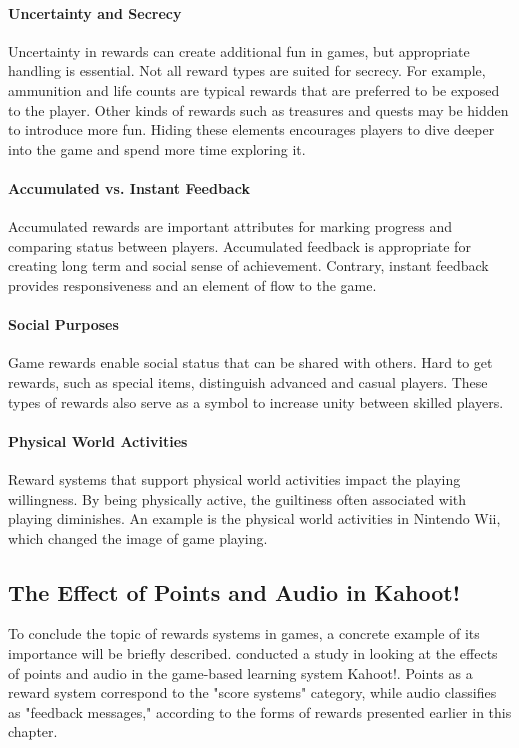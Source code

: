 \paragraph*{Uncertainty and Secrecy}
Uncertainty in rewards can create additional fun in games, but appropriate handling is essential. Not all reward types are suited for secrecy. For example, ammunition and life counts are typical rewards that are preferred to be exposed to the player. Other kinds of rewards such as treasures and quests may be hidden to introduce more fun. Hiding these elements encourages players to dive deeper into the game and spend more time exploring it. 

\paragraph*{Accumulated vs. Instant Feedback}
Accumulated rewards are important attributes for marking progress and comparing status between players. Accumulated feedback is appropriate for creating long term and social sense of achievement. Contrary, instant feedback provides responsiveness and an element of flow to the game.

\paragraph*{Social Purposes}
Game rewards enable social status that can be shared with others. Hard to get rewards, such as special items, distinguish advanced and casual players. These types of rewards also serve as a symbol to increase unity between skilled players.

\paragraph*{Physical World Activities}
Reward systems that support physical world activities impact the playing willingness. By being physically active, the guiltiness often associated with playing diminishes. An example is the physical world activities in Nintendo Wii, which changed the image of game playing.

\subsection{The Effect of Points and Audio in Kahoot!}
To conclude the topic of rewards systems in games, a concrete example of its importance will be briefly described. \citeauthor{wang_effect_2016} conducted a study in \citeyear{wang_effect_2016} looking at the effects of points and audio in the game-based learning system Kahoot!. Points as a reward system correspond to the "score systems" category, while audio classifies as "feedback messages," according to the forms of rewards presented earlier in this chapter.  

